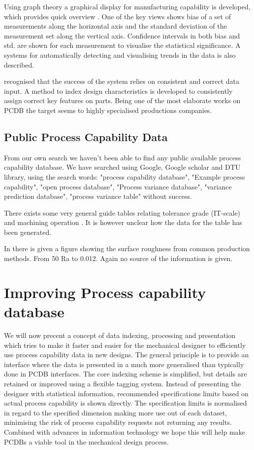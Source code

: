 \documentclass[aip,amsmath, reprint, author-year]{revtex4-1}
\begin{document}
Using graph theory a graphical display for manufacturing capability is developed, which provides quick overview \citep{thornton2000use}. 
One of the key views shows bias of a set of measurements along the horizontal axis and the standard deviation of the measurement set along the vertical axis. 
Confidence intervals in both bias and std. are shown for each measurement to visualise the statistical significance. 
A systems for automatically detecting and visualising trends in the data is also described.

\cite{kern2003forecasting} recognised that the success of the system relies on consistent and correct data input. 
A method to index design characteristics is developed to consistently assign correct key features on parts. 
Being one of the most elaborate works on PCDB the target seems to highly specialised productions companies. 


\subsection{Public Process Capability Data}
From our own search we haven't been able to find any public available process capability database. 
We have searched using Google, Google scholar and DTU library, using the search words: "process capability database", "Example process capability", "open process database", "Process variance database", "variance prediction database", "process variance table" without success. 

There exists some very general guide tables relating tolerance grade (IT-scale) and machining operation \citep{united1967preferred, american1978preferred}. 
It is however unclear how the data for the table has been generated.

In \cite[p. 715]{oberg2008machinery} there is given a figure showing the surface roughness from common production methods. From 50 Ra to 0.012. 
Again no source of the information is given. \\[1cm]


\section{Improving Process capability database}
We will now precent a concept of data indexing, processing and presentation which tries to make it faster and easier for the mechanical designer to efficiently use process capability data in new designs. 
The general principle is to provide an interface where the data is presented in a much more generalised than typically done in PCDB interfaces. 
The core indexing scheme is simplified, but details are retained or improved using a flexible tagging system. 
Instead of presenting the designer with statistical information, recommended specifications limits based on actual process capability is shown directly. 
The specification limits is normalised in regard to the specified dimension making more use out of each dataset, minimising the risk of process capability requests not returning any results. 
Combined with advances in information technology we hope this will help make PCDBs a viable tool in the mechanical design process.
\end{document}
